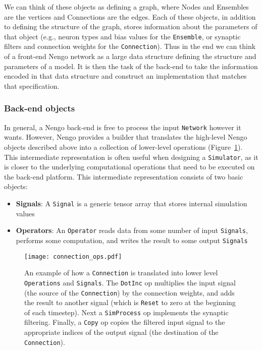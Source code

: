 \documentclass{article}
\begin{document}
We can think of these objects as defining a graph, where Nodes and Ensembles are the vertices and Connections are the edges.  Each of these objects, in addition to defining the structure of the graph, stores information about the parameters of that object (e.g., neuron types and bias values for the \texttt{Ensemble}, or synaptic filters and connection weights for the \texttt{Connection}).  Thus in the end we can think of a front-end Nengo network as a large data structure defining the structure and parameters of a model.  It is then the task of the back-end to take the information encoded in that data structure and construct an implementation that matches that specification.

\subsubsection{Back-end objects}

In general, a Nengo back-end is free to process the input \texttt{Network} however it wants.  However, Nengo provides a builder that translates the high-level Nengo objects described above into a collection of lower-level operations (Figure~\ref{fig:connection_ops}).  This intermediate representation is often useful when designing a \texttt{Simulator}, as it is closer to the underlying computational operations that need to be executed on the back-end platform.  This intermediate representation consists of two basic objects:

\begin{itemize}
\item {\bf Signals}: A \texttt{Signal} is a generic tensor array that stores internal simulation values
\item {\bf Operators}: An \texttt{Operator} reads data from some number of input \texttt{Signals}, performs some computation, and writes the result to some output \texttt{Signals}
\end{itemize}

\begin{figure}
\centering
\texttt{[image: connection\_ops.pdf]}
\caption{An example of how a \texttt{Connection} is translated into lower level \texttt{Operations} and \texttt{Signals}.  The \texttt{DotInc} op multiplies the input signal (the source of the \texttt{Connection}) by the connection weights, and adds the result to another signal (which is \texttt{Reset} to zero at the beginning of each timestep).  Next a \texttt{SimProcess} op implements the synaptic filtering.  Finally, a \texttt{Copy} op copies the filtered input signal to the appropriate indices of the output signal (the destination of the \texttt{Connection}).}
\label{fig:connection_ops}
\end{figure}
\end{document}
